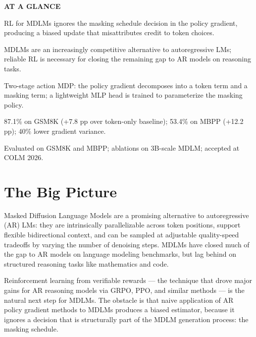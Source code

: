 \documentclass[10pt,twocolumn]{article}
\begin{document}
\begin{mdframed}[backgroundcolor=boxgray,linecolor=rulered,linewidth=1pt,
    innerleftmargin=6pt,innerrightmargin=6pt,
    innertopmargin=6pt,innerbottommargin=6pt]
\textbf{\small AT A GLANCE}\par\vspace{4pt}
\begin{description}[leftmargin=0pt,labelsep=4pt,itemsep=2pt,parsep=0pt,
    font=\small\bfseries]
  \item[Problem:] RL for MDLMs ignores the masking schedule decision
    in the policy gradient, producing a biased update that
    misattributes credit to token choices.
  \item[Why it matters:] MDLMs are an increasingly competitive
    alternative to autoregressive LMs; reliable RL is necessary
    for closing the remaining gap to AR models on reasoning tasks.
  \item[Method:] Two-stage action MDP: the policy gradient decomposes
    into a token term and a masking term; a lightweight MLP head
    is trained to parameterize the masking policy.
  \item[Result:] 87.1\% on GSM8K (+7.8 pp over token-only baseline);
    53.4\% on MBPP (+12.2 pp); 40\% lower gradient variance.
  \item[Evidence:] Evaluated on GSM8K and MBPP; ablations on 3B-scale
    MDLM; accepted at COLM 2026.
\end{description}
\end{mdframed}

\section{The Big Picture}

Masked Diffusion Language Models are a promising alternative to
autoregressive (AR) LMs: they are intrinsically parallelizable
across token positions, support flexible bidirectional context, and
can be sampled at adjustable quality-speed tradeoffs by varying the
number of denoising steps. MDLMs have closed much of the gap to
AR models on language modeling benchmarks, but lag behind on
structured reasoning tasks like mathematics and code.

Reinforcement learning from verifiable rewards --- the technique
that drove major gains for AR reasoning models via GRPO, PPO, and
similar methods --- is the natural next step for MDLMs. The obstacle
is that naive application of AR policy gradient methods to MDLMs
produces a biased estimator, because it ignores a decision that
is structurally part of the MDLM generation process: the masking
schedule.
\end{document}

